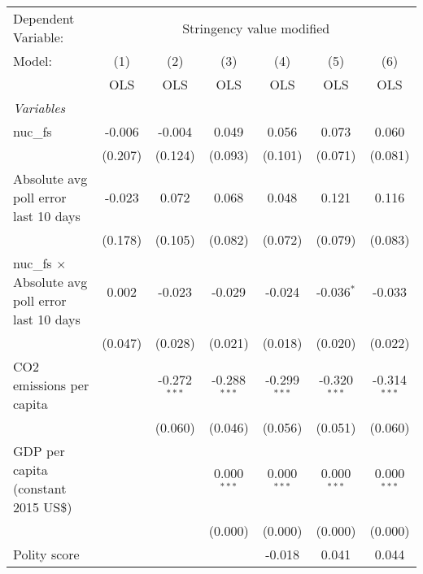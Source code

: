 
\begingroup
\centering
\begin{tabular}{lcccccc}
   \toprule
   Dependent Variable: & \multicolumn{6}{c}{Stringency value modified}\\
   Model:                                                  & (1)     & (2)            & (3)            & (4)            & (5)            & (6)\\  
                                                           &  OLS    & OLS            & OLS            & OLS            & OLS            & OLS\\  
   \midrule
   \emph{Variables}\\
   nuc\_fs                                                 & -0.006  & -0.004         & 0.049          & 0.056          & 0.073          & 0.060\\   
                                                           & (0.207) & (0.124)        & (0.093)        & (0.101)        & (0.071)        & (0.081)\\   
   Absolute avg poll error last 10 days                    & -0.023  & 0.072          & 0.068          & 0.048          & 0.121          & 0.116\\   
                                                           & (0.178) & (0.105)        & (0.082)        & (0.072)        & (0.079)        & (0.083)\\   
   nuc\_fs $\times$ Absolute avg poll error last 10 days   & 0.002   & -0.023         & -0.029         & -0.024         & -0.036$^{*}$   & -0.033\\   
                                                           & (0.047) & (0.028)        & (0.021)        & (0.018)        & (0.020)        & (0.022)\\   
   CO2 emissions per capita                                &         & -0.272$^{***}$ & -0.288$^{***}$ & -0.299$^{***}$ & -0.320$^{***}$ & -0.314$^{***}$\\   
                                                           &         & (0.060)        & (0.046)        & (0.056)        & (0.051)        & (0.060)\\   
   GDP per capita (constant 2015 US\$)                     &         &                & 0.000$^{***}$  & 0.000$^{***}$  & 0.000$^{***}$  & 0.000$^{***}$\\   
                                                           &         &                & (0.000)        & (0.000)        & (0.000)        & (0.000)\\   
   Polity score                                            &         &                &                & -0.018         & 0.041          & 0.044\\   

\end{tabular}
